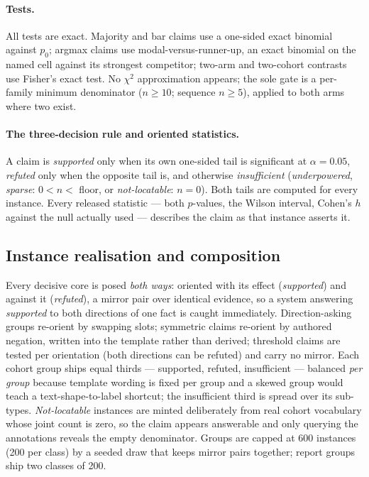 \paragraph{Tests.} All tests are exact. Majority and bar claims use a one-sided
exact binomial against $p_0$; argmax claims use modal-versus-runner-up, an exact
binomial on the named cell against its strongest competitor; two-arm and
two-cohort contrasts use Fisher's exact test. No $\chi^2$ approximation
appears; the sole gate is a per-family minimum denominator ($n \geq 10$;
sequence $n \geq 5$), applied to both arms where two exist.

\paragraph{The three-decision rule and oriented statistics.} A claim is
\emph{supported} only when its own one-sided tail is significant at
$\alpha = 0.05$, \emph{refuted} only when the opposite tail is, and otherwise
\emph{insufficient} (\emph{underpowered}, \emph{sparse}: $0 < n <$ floor, or
\emph{not-locatable}: $n = 0$). Both tails are computed for every instance.
Every released statistic --- both $p$-values, the Wilson interval, Cohen's $h$
against the null actually used --- describes the claim as that instance asserts
it.

\subsection{Instance realisation and composition}
\label{sec:realization}

Every decisive core is posed \emph{both ways}: oriented with its effect
(\emph{supported}) and against it (\emph{refuted}), a mirror pair over
identical evidence, so a system answering \emph{supported} to both directions
of one fact is caught immediately. Direction-asking groups re-orient by
swapping slots; symmetric claims re-orient by authored negation, written into
the template rather than derived; threshold claims are tested per orientation
(both directions can be refuted) and carry no mirror. Each cohort group ships
equal thirds --- supported, refuted, insufficient --- balanced \emph{per group}
because template wording is fixed per group and a skewed group would teach a
text-shape-to-label shortcut; the insufficient third is spread over its
sub-types. \emph{Not-locatable} instances are minted deliberately from real
cohort vocabulary whose joint count is zero, so the claim appears answerable and
only querying the annotations reveals the empty denominator. Groups are capped
at 600 instances (200 per class) by a seeded draw that keeps mirror pairs
together; report groups ship two classes of 200.

